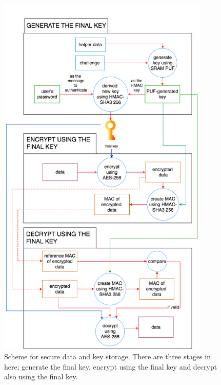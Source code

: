 \begin{figure}[tph!]
    \centerline{\includegraphics[width={0.9\textwidth}]{images/proposed}}
    \caption{Scheme for secure data and key storage. There are three stages in here; generate the final key, encrypt using the final key and decrypt also using the final key.}
    \label{fig:scheme-data-protection}
\end{figure}

